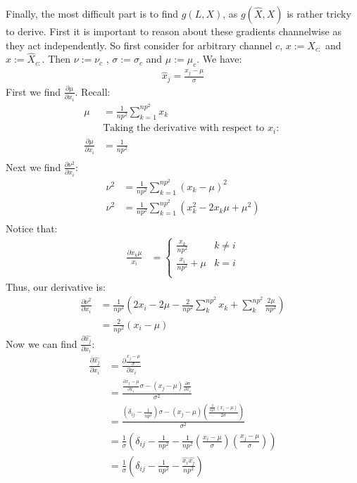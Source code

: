 \documentclass[12pt]{article}
\begin{document}
Finally, the most difficult part is to find $g(L, X)$, as $g(\hat{X}, X)$ is rather tricky to derive.
First it is important to reason about these gradients channelwise as they act independently.
So first consider for arbitrary channel $c$, $x := X_{c:}$ and $\hat{x} := \hat{X}_{c:}$. Then
$\nu := \nu_c$ , $\sigma := \sigma_c$ and $\mu := \mu_c$. We have:
\begin{align*}
    \hat{x}_j = \frac{x_j - \mu}{\sigma}
\end{align*} 
First we find $\frac{\partial \mu}{\partial x_i}$. Recall:
\begin{align*}
    \mu &= \frac{1}{np^2}\sum_{k = 1}^{np^2}x_k \\
    & \text{Taking the derivative with respect to $x_i$: } \\
    \frac{\partial \mu}{\partial x_i} &= \frac{1}{np^2} \\
\end{align*}
Next we find $\frac{\partial \nu^2}{\partial x_i}$:
\begin{align*}
    \nu^2 &= \frac{1}{np^2}\sum_{k=1}^{np^2}(x_k - \mu)^2 \\
    \nu^2 &= \frac{1}{np^2}\sum_{k=1}^{np^2}(x_k^2 - 2x_k\mu + \mu^2) \\
\end{align*}
Notice that:
\begin{align*}
    \frac{\partial x_k\mu}{x_i} &=
    \begin{cases}
        \frac{x_k}{np^2} & k \neq i \\
        \frac{x_i}{np^2} + \mu & k = i \\
    \end{cases}
\end{align*}
Thus, our derivative is:
\begin{align*}
    \frac{\partial \nu^2}{\partial x_i} &= \frac{1}{np^2}(2x_i -2\mu - \frac{2}{np^2}\sum_{k}^{np^2}x_k + \sum_{k}^{np^2}\frac{2\mu}{np^2}) \\
    &= \frac{2}{np^2}(x_i - \mu)
\end{align*}
Now we can find $\frac{\partial \hat{x_j}}{\partial x_i}$:
\begin{align*}
    \frac{\partial \hat{x_j}}{\partial x_i} &= \frac{\partial \frac{x_j - \mu}{\sigma}}{\partial x_i} \\
    &= \frac{\frac{\partial x_j - \mu}{\partial x_i}\sigma - (x_j - \mu)\frac{\partial \sigma}{\partial x_i}}{\sigma^2} \\
    &= \frac{(\delta_{ij} - \frac{1}{np^2})\sigma - (x_j - \mu)(\frac{\frac{2}{np^2}(x_i - \mu)}{2\sigma})}{\sigma^2} \\
    &= \frac{1}{\sigma}(\delta_{ij} - \frac{1}{np^2} - \frac{1}{np^2}(\frac{x_i - \mu}{\sigma})(\frac{x_j - \mu}{\sigma})) \\
    &= \frac{1}{\sigma}(\delta_{ij} - \frac{1}{np^2} - \frac{\hat{x_i}\hat{x_j}}{np^2})
\end{align*}
\end{document}
